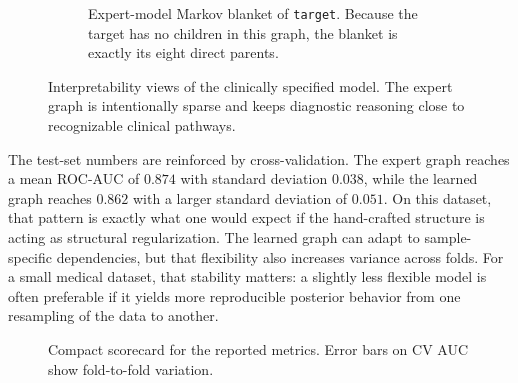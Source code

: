 \documentclass[10pt,twocolumn]{article}
\begin{document}
\begin{figure}[t]
\begin{subfigure}[t]{0.42\textwidth}
\caption{Expert-model Markov blanket of \texttt{target}. Because the target has no children in this graph, the blanket is exactly its eight direct parents.}
\label{fig:mb}
\end{subfigure}
\caption{Interpretability views of the clinically specified model. The expert graph is intentionally sparse and keeps diagnostic reasoning close to recognizable clinical pathways.}
\label{fig:structure}
\end{figure}

The test-set numbers are reinforced by cross-validation. The expert graph reaches a mean ROC-AUC of $0.874$ with standard deviation $0.038$, while the learned graph reaches $0.862$ with a larger standard deviation of $0.051$. On this dataset, that pattern is exactly what one would expect if the hand-crafted structure is acting as structural regularization. The learned graph can adapt to sample-specific dependencies, but that flexibility also increases variance across folds. For a small medical dataset, that stability matters: a slightly less flexible model is often preferable if it yields more reproducible posterior behavior from one resampling of the data to another.

\begin{figure}[t]
\centering
{}
\caption{Compact scorecard for the reported metrics. Error bars on CV AUC show fold-to-fold variation.}
\label{fig:scorecard}
\end{figure}
\end{document}
